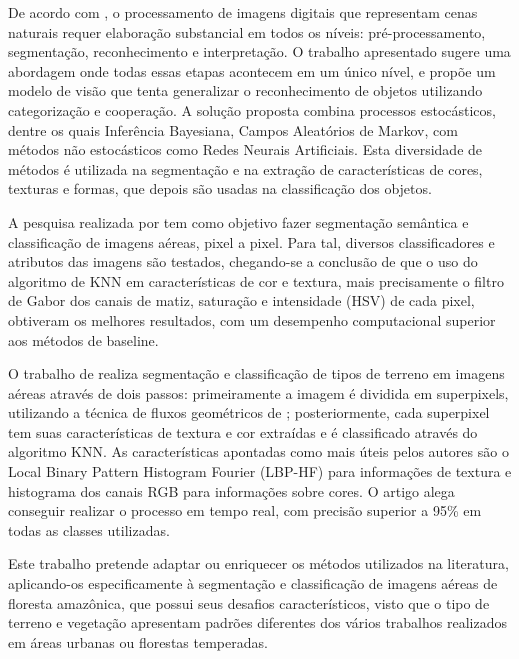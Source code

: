 De acordo com \cite{sadgal:2005}, o processamento de imagens digitais que representam cenas naturais requer elaboração substancial em todos os níveis: pré-processamento, segmentação, reconhecimento e interpretação. O trabalho apresentado sugere uma abordagem onde todas essas etapas acontecem em um único nível, e propõe um modelo de visão que tenta generalizar o reconhecimento de objetos utilizando categorização e cooperação.  A solução proposta combina processos estocásticos, dentre os quais Inferência Bayesiana, Campos Aleatórios de Markov, com métodos não estocásticos como Redes Neurais Artificiais. Esta diversidade de métodos é utilizada na segmentação e na extração de características de cores, texturas e formas, que depois são usadas na classificação dos objetos.

A pesquisa realizada por \cite{ahmadi:2013} tem como objetivo fazer segmentação semântica e classificação de imagens aéreas, pixel a pixel. Para tal, diversos classificadores e atributos das imagens são testados, chegando-se a conclusão de que o uso do algoritmo de KNN em características de cor e textura, mais precisamente o filtro de Gabor \cite{fogel:1989} dos canais de matiz, saturação e intensidade (HSV) de cada pixel, obtiveram os melhores resultados, com um desempenho computacional superior aos métodos de baseline.

O trabalho de \cite{ghiasi:2013} realiza segmentação e classificação de tipos de terreno em imagens aéreas através de dois passos: primeiramente a imagem é dividida em superpixels, utilizando a técnica de fluxos geométricos de \cite{levinshtein:2009}; posteriormente, cada superpixel tem suas características de textura e cor extraídas e é classificado através do algoritmo KNN. As características apontadas como mais úteis pelos autores são o Local Binary Pattern Histogram Fourier (LBP-HF) \cite{ahonen:2009} para informações de textura e histograma dos canais RGB para informações sobre cores. O artigo alega conseguir realizar o processo em tempo real, com precisão superior a 95\% em todas as classes utilizadas.

Este trabalho pretende adaptar ou enriquecer os métodos utilizados na literatura, aplicando-os especificamente à segmentação e classificação de imagens aéreas de floresta amazônica, que possui seus desafios característicos, visto que o tipo de terreno e vegetação apresentam padrões diferentes dos vários trabalhos realizados em áreas urbanas ou florestas temperadas.